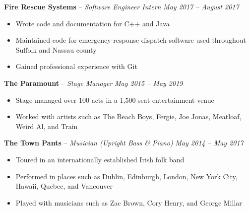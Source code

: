 \documentclass[10pt,letterpaper]{article}
\begin{document}


\headedsection 
{\textbf{Fire Rescue Systems} -- \textit{Software Engineer Intern}}
{\textit{May 2017 -- August 2017}} {
	\begin{itemize}[noitemsep,nolistsep]
		\item Wrote code and documentation for C++ and Java
		\item Maintained code for emergency-response dispatch software used throughout Suffolk and Nassau county
		\item Gained professional experience with Git 
	\end{itemize}
}
\vspace{-1mm}


\headedsection 
{\textbf{The Paramount} -- \textit{Stage Manager}}
{\textit{May 2015 -- May 2019}} {
	\begin{itemize}[noitemsep,nolistsep]
		\item Stage-managed over 100 acts in a 1,500 seat entertainment venue
		\item Worked with artists such as The Beach Boys, Fergie, Joe Jonas, Meatloaf, Weird Al, and Train
	\end{itemize}
}
\vspace{-1mm}


\headedsection 
{\textbf{The Town Pants} -- \textit{Musician (Upright Bass \& Piano)}}
{\textit{May 2014 -- May 2017}} {
	\begin{itemize}[noitemsep,nolistsep]
		\item Toured in an internationally established Irish folk band
		\item Performed in places such as Dublin, Edinburgh, London, New York City, Hawaii, Quebec, and Vancouver
		\item Played with musicians such as Zac Brown, Cory Henry, and George Millar
	\end{itemize}
}

\spacedhrule{0.3em}{-0.5em} 









\end{document}

